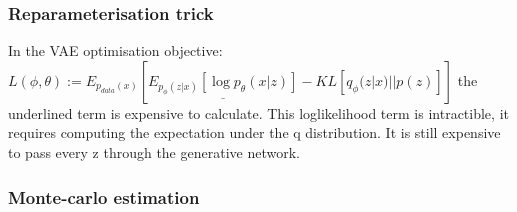 \documentclass[11pt]{article}
\begin{document}
\begin{figure}[H]
    \centering
\end{figure}

\subsubsection{Reparameterisation trick}

In the VAE optimisation objective: $L(\phi, \theta) := E_{p_{data}(x)}[\underline{E_{p_\phi(z|x)}[\log p_\theta(x|z)]} - KL[q_\phi(z|x)||p(z)]]$ the underlined term is expensive to calculate. This loglikelihood term is intractible, it requires computing the expectation under the q distribution. It is still expensive to pass every z through the generative network. 

\subsubsection{Monte-carlo estimation}
\end{document}
